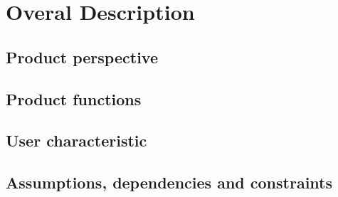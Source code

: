 \section{Overal Description}

\subsection{Product perspective}


\subsection{Product functions}


\subsection{User characteristic}


\subsection{Assumptions, dependencies and constraints}


